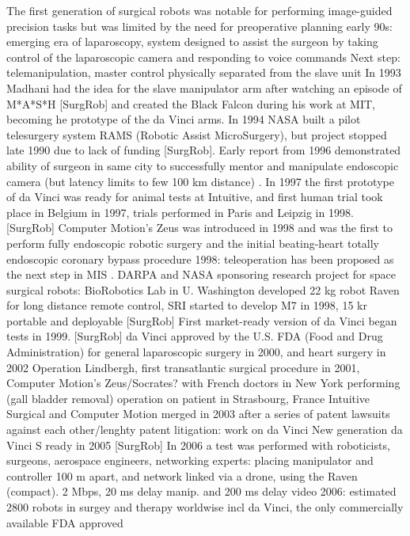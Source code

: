 The first generation of surgical robots was notable for performing image-guided precision tasks but was limited by the need for preoperative planning
early 90s: emerging era of laparoscopy, system designed to assist the surgeon by taking control of the laparoscopic camera and responding to voice commands
Next step: telemanipulation, master control physically separated from the slave unit
In 1993 Madhani had the idea for the slave manipulator arm after watching an episode of M*A*S*H [SurgRob] and created the Black Falcon during his work at MIT, becoming he prototype of the da Vinci arms.
In 1994 NASA built a pilot telesurgery system RAMS (Robotic Assist MicroSurgery), but project stopped late 1990 due to lack of funding [SurgRob].
Early report from 1996 demonstrated ability of surgeon in same city to successfully mentor and manipulate endoscopic camera (but latency limits to few 100 km distance) \citep{bib:telesurg_history}.
In 1997 the first prototype of da Vinci was ready for animal tests at Intuitive, and first human trial took place in Belgium in 1997, trials performed in Paris and Leipzig in 1998. [SurgRob]
Computer Motion's Zeus was introduced in 1998 and was the first to perform fully endoscopic robotic surgery and the initial beating-heart totally endoscopic coronary bypass procedure \citep{bib:brown_univ}
1998: teleoperation has been proposed as the next step in MIS \citep{bib:black_falcon}.
DARPA and NASA sponsoring research project for space surgical robots: BioRobotics Lab in U. Washington developed 22 kg robot Raven for long distance remote control, SRI started to develop M7 in 1998, 15 kr portable and deployable [SurgRob]
First market-ready version of da Vinci began tests in 1999. [SurgRob]
da Vinci approved by the U.S. FDA (Food and Drug Administration) for general laparoscopic surgery in 2000, and heart surgery in 2002 \citep{bib:brown_univ}
Operation Lindbergh, first transatlantic surgical procedure in 2001, Computer Motion's Zeus/Socrates? with French doctors in New York performing (gall bladder removal) operation on patient in Strasbourg, France
Intuitive Surgical and Computer Motion merged in 2003 after a series of patent lawsuits against each other/lenghty patent litigation: work on da Vinci
New generation da Vinci S ready in 2005 [SurgRob]
In 2006 a test was performed with roboticists, surgeons, aerospace engineers, networking experts: placing manipulator and controller 100 m apart, and network linked via a drone, using the Raven \citep{bib:docatadist} (compact). 2 Mbps, 20 ms delay manip. and 200 ms delay video
2006: estimated 2800 robots in surgey and therapy worldwise incl da Vinci, the only commercially available FDA approved


